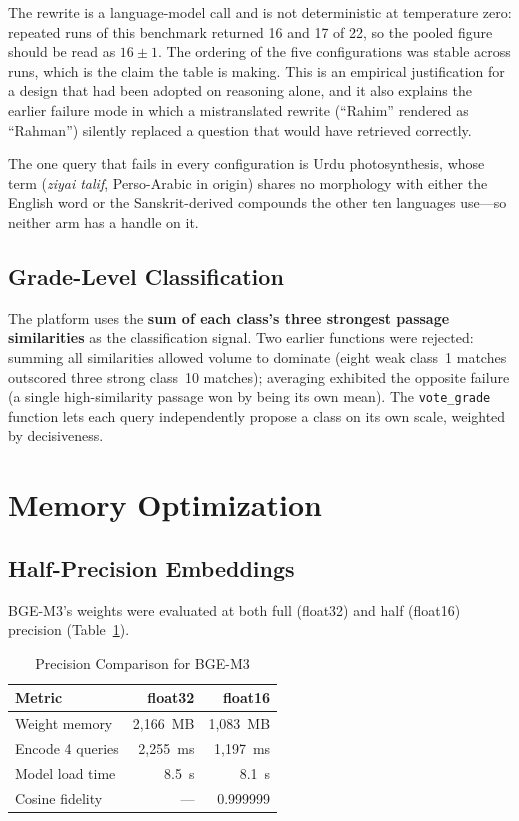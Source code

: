 \documentclass[conference]{IEEEtran}
\begin{document}
The rewrite is a language-model call and is not deterministic at temperature zero: repeated runs of this benchmark returned 16 and 17 of 22, so the pooled figure should be read as $16\pm1$. The ordering of the five configurations was stable across runs, which is the claim the table is making. This is an empirical justification for a design that had been adopted on reasoning alone, and it also explains the earlier failure mode in which a mistranslated rewrite (``Rahim'' rendered as ``Rahman'') silently replaced a question that would have retrieved correctly.

The one query that fails in every configuration is Urdu photosynthesis, whose term (\textit{ziyai talif}, Perso-Arabic in origin) shares no morphology with either the English word or the Sanskrit-derived compounds the other ten languages use---so neither arm has a handle on it.
\subsection{Grade-Level Classification}
\label{sec:grade}
The platform uses the \textbf{sum of each class's three strongest passage similarities} as the classification signal. Two earlier functions were rejected: summing all similarities allowed volume to dominate (eight weak class~1 matches outscored three strong class~10 matches); averaging exhibited the opposite failure (a single high-similarity passage won by being its own mean). The \texttt{vote\_grade} function lets each query independently propose a class on its own scale, weighted by decisiveness.

\section{Memory Optimization}

\subsection{Half-Precision Embeddings}
\label{sec:precision}
BGE-M3's weights were evaluated at both full (float32) and half (float16) precision (Table~\ref{tab:precision}).

\begin{table}[htbp]
\caption{Precision Comparison for BGE-M3}
\label{tab:precision}
\centering
\begin{tabular}{@{}lrr@{}}
\toprule
\textbf{Metric} & \textbf{float32} & \textbf{float16} \\
\midrule
Weight memory & 2,166~MB & 1,083~MB \\
Encode 4 queries & 2,255~ms & 1,197~ms \\
Model load time & 8.5~s & 8.1~s \\
Cosine fidelity & --- & 0.999999 \\
\bottomrule
\end{tabular}
\end{table}
\end{document}
